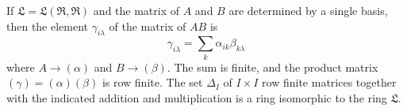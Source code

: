 If $\mathfrak{L} = \mathfrak{L}(\mathfrak{R}, \mathfrak{R})$ and the matrix of $A$ and $B$ are determined by a single basis, then the element $\gamma_{i\lambda}$ of the matrix of $AB$ is
$$\gamma_{i\lambda} = \sum_k \alpha_{ik}\beta_{k\lambda}$$
where $A \to (\alpha)$ and $B \to (\beta)$. The sum is finite, and the product matrix $(\gamma) = (\alpha)(\beta)$ is row finite. The set $\Delta_I$ of $I \times I$ row finite matrices together with the indicated addition and multiplication is a ring isomorphic to the ring $\mathfrak{L}$.
